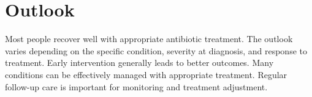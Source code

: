 \section{Outlook}
Most people recover well with appropriate antibiotic treatment. The outlook varies depending on the specific condition, severity at diagnosis, and response to treatment. Early intervention generally leads to better outcomes. Many conditions can be effectively managed with appropriate treatment. Regular follow-up care is important for monitoring and treatment adjustment.
